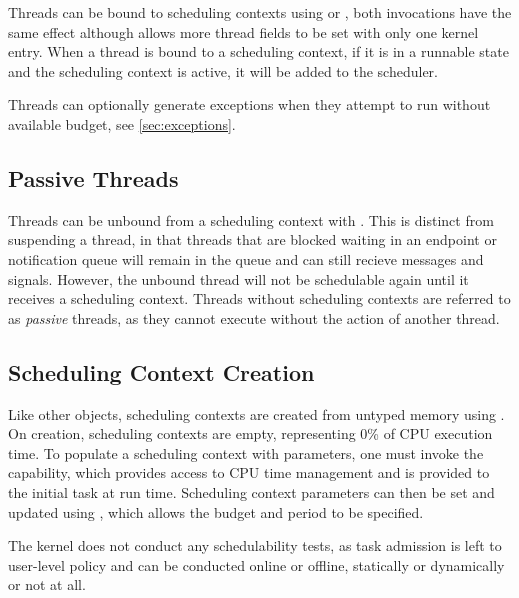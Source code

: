 Threads can be bound to scheduling contexts using  or 
, both invocations have the same effect although  allows more thread fields to be set with only one kernel entry. 
When a thread is bound to a scheduling context, if it is in a runnable state and the scheduling context is active, it will be added to the scheduler.

Threads can optionally generate exceptions when they attempt to run without available budget, see \autoref{sec:exceptions}.

\subsection{Passive Threads}
\label{sec:passive}

Threads can be unbound from a scheduling context with . 
This is distinct from suspending a thread, in that threads that are blocked waiting in an endpoint or notification queue will remain 
in the queue and can still recieve messages and signals. 
However, the unbound thread will not be schedulable again until it receives a scheduling context.
Threads without scheduling contexts are referred to as \emph{passive} threads, as they cannot execute without the action of another thread. 

\subsection{Scheduling Context Creation}
\label{sec:sc_creation}

Like other objects, scheduling contexts are created from untyped memory using .
On creation, scheduling contexts are empty, representing 0\% of CPU execution time.
To populate a scheduling context with parameters, one must invoke the  capability, which provides access to CPU time management and is provided to the initial task at run time.
Scheduling context parameters can then be set and updated using , which allows the budget and period to be specified.

The kernel does not conduct any schedulability tests, as task admission is left to user-level policy and can be conducted online or offline, statically or dynamically or not at all. 

